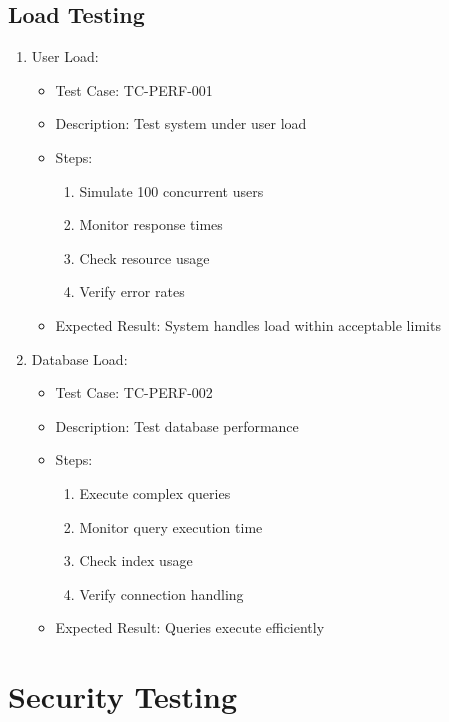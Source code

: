 \subsection{Load Testing}
\begin{enumerate}
    \item User Load:
    \begin{itemize}
        \item Test Case: TC-PERF-001
        \item Description: Test system under user load
        \item Steps:
        \begin{enumerate}
            \item Simulate 100 concurrent users
            \item Monitor response times
            \item Check resource usage
            \item Verify error rates
        \end{enumerate}
        \item Expected Result: System handles load within acceptable limits
    \end{itemize}

    \item Database Load:
    \begin{itemize}
        \item Test Case: TC-PERF-002
        \item Description: Test database performance
        \item Steps:
        \begin{enumerate}
            \item Execute complex queries
            \item Monitor query execution time
            \item Check index usage
            \item Verify connection handling
        \end{enumerate}
        \item Expected Result: Queries execute efficiently
    \end{itemize}
\end{enumerate}

\section{Security Testing}

